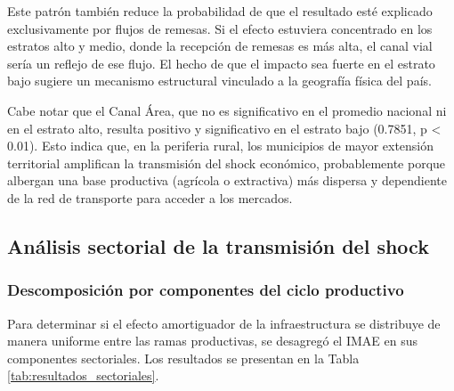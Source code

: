 \documentclass[
  spanish,
  12pt,
  letterpaper]{article}
\begin{document}
Este patrón también reduce la probabilidad de que el resultado esté
explicado exclusivamente por flujos de remesas. Si el efecto estuviera
concentrado en los estratos alto y medio, donde la recepción de remesas
es más alta, el canal vial sería un reflejo de ese flujo. El hecho de
que el impacto sea fuerte en el estrato bajo sugiere un mecanismo
estructural vinculado a la geografía física del país.

Cabe notar que el Canal Área, que no es significativo en el promedio
nacional ni en el estrato alto, resulta positivo y significativo en el
estrato bajo (0.7851, p \textless{} 0.01). Esto indica que, en la
periferia rural, los municipios de mayor extensión territorial
amplifican la transmisión del shock económico, probablemente porque
albergan una base productiva (agrícola o extractiva) más dispersa y
dependiente de la red de transporte para acceder a los mercados.

\subsection{Análisis sectorial de la transmisión del
shock}\label{anuxe1lisis-sectorial-de-la-transmisiuxf3n-del-shock}

\subsubsection{Descomposición por componentes del ciclo
productivo}\label{descomposiciuxf3n-por-componentes-del-ciclo-productivo}

Para determinar si el efecto amortiguador de la infraestructura se
distribuye de manera uniforme entre las ramas productivas, se desagregó
el IMAE en sus componentes sectoriales. Los resultados se presentan en
la Tabla \ref{tab:resultados_sectoriales}.
\end{document}
